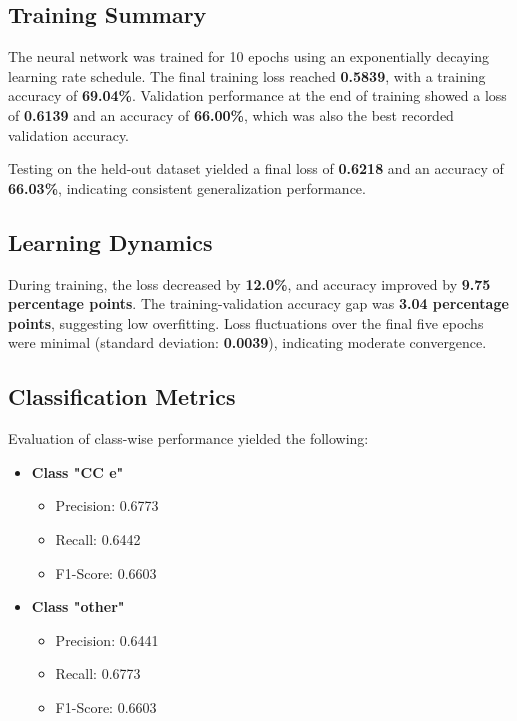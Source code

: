 \documentclass{pracalicmgr}
\begin{document}
\subsection{Training Summary}

The neural network was trained for 10 epochs using an exponentially decaying learning rate schedule. The final training loss reached \textbf{0.5839}, with a training accuracy of \textbf{69.04\%}. Validation performance at the end of training showed a loss of \textbf{0.6139} and an accuracy of \textbf{66.00\%}, which was also the best recorded validation accuracy.

Testing on the held-out dataset yielded a final loss of \textbf{0.6218} and an accuracy of \textbf{66.03\%}, indicating consistent generalization performance.

\subsection{Learning Dynamics}

During training, the loss decreased by \textbf{12.0\%}, and accuracy improved by \textbf{9.75 percentage points}. The training-validation accuracy gap was \textbf{3.04 percentage points}, suggesting low overfitting. Loss fluctuations over the final five epochs were minimal (standard deviation: \textbf{0.0039}), indicating moderate convergence.

\subsection{Classification Metrics}

Evaluation of class-wise performance yielded the following:

\begin{itemize}
    \item \textbf{Class "CC e"}
    \begin{itemize}
        \item Precision: 0.6773
        \item Recall: 0.6442
        \item F1-Score: 0.6603
    \end{itemize}
    \item \textbf{Class "other"}
    \begin{itemize}
        \item Precision: 0.6441
        \item Recall: 0.6773
        \item F1-Score: 0.6603
    \end{itemize}
\end{itemize}
\end{document}
